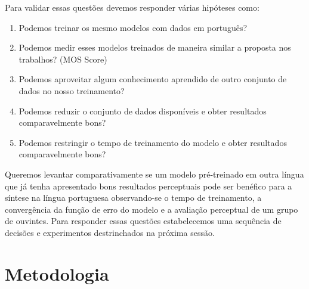 \documentclass{article}
\begin{document}
Para validar essas questões devemos responder várias hipóteses como:

\begin{enumerate}
	\item \label{it:h1} Podemos treinar os mesmo modelos com dados em português?
	\item \label{it:h2} Podemos medir esses modelos treinados de maneira similar a proposta nos trabalhos? (MOS Score)
	\item \label{it:h3} Podemos aproveitar algum conhecimento aprendido de outro conjunto de dados no nosso treinamento? 
	\item \label{it:h4} Podemos reduzir o conjunto de dados disponíveis e obter resultados comparavelmente bons?
	\item \label{it:h5} Podemos restringir o tempo de treinamento do modelo e obter resultados comparavelmente bons?
\end{enumerate}

Queremos levantar comparativamente se um modelo pré-treinado em outra língua que já tenha apresentado bons resultados perceptuais pode ser benéfico para a síntese na língua portuguesa observando-se o tempo de treinamento, a convergência da função de erro do modelo e a avaliação perceptual de um grupo de ouvintes.
Para responder essas questões estabelecemos uma sequência de decisões e experimentos destrinchados na próxima sessão.

\section{Metodologia}
\end{document}
